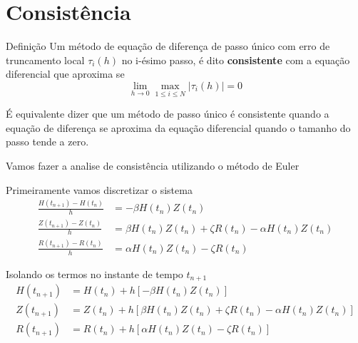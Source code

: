 \documentclass[xcolor=dvipsnames, aspectratio=169]{beamer}
\begin{document}
    \section{Consistência}
    \begin{frame}
        \begin{block}{Definição}
            Um método de equação de diferença de passo único com erro de truncamento local $\tau_i (h)$ no i-ésimo passo, é dito \textbf{consistente} com a equação diferencial que aproxima se
            \[
                \lim_{h\to 0} \max_{1 \leqslant i \leqslant N} |\tau_i(h)| = 0
            \] 
        \end{block}
        É equivalente dizer que um método de passo único é consistente quando a equação de diferença se aproxima da equação diferencial quando o tamanho do passo tende a zero.

        Vamos fazer a analise de consistência utilizando o método de Euler
    \end{frame}
    \begin{frame}
        Primeiramente vamos discretizar o sistema
        \begin{align*}
            \frac{H(t_{n+1}) - H(t_n)}{h} &= -\beta H(t_n) Z(t_n)\\
            \frac{Z(t_{n+1}) - Z(t_n)}{h} &= \beta H(t_n) Z(t_n) + \zeta R(t_n) - \alpha H(t_n) Z(t_n)\\
            \frac{R(t_{n+1}) - R(t_n)}{h} &= \alpha H(t_n) Z(t_n) - \zeta R(t_n)
        \end{align*}
    \end{frame}
    \begin{frame}
        Isolando os termos no instante de tempo $t_{n+1}$
        \begin{align*}
            H(t_{n+1}) &=  H(t_n)  + h[-\beta H(t_n) Z(t_n)]\\
            Z(t_{n+1}) &=  Z(t_n) + h[\beta H(t_n) Z(t_n) + \zeta R(t_n) - \alpha H(t_n) Z(t_n)]\\
            R(t_{n+1}) &= R(t_n) + h[\alpha H(t_n) Z(t_n) - \zeta R(t_n)]
        \end{align*}
    \end{frame}
\end{document}
